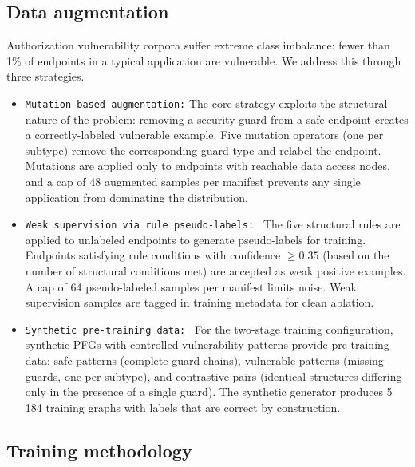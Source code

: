 \subsection{Data augmentation}
\label{sec:det-augmentation}

Authorization vulnerability corpora suffer extreme class imbalance: fewer
than 1\% of endpoints in a typical application are vulnerable. We address
this through three strategies.

\begin{itemize}


\item \texttt{Mutation-based augmentation:}
The core strategy exploits the structural nature of the problem: removing a
security guard from a safe endpoint creates a correctly-labeled vulnerable
example. Five mutation operators (one per subtype) remove the corresponding
guard type and relabel the endpoint. Mutations are applied only to endpoints
with reachable data access nodes, and a cap of 48 augmented samples per
manifest prevents any single application from dominating the distribution.

\item \texttt{Weak supervision via rule pseudo-labels: }
The five structural rules are applied to unlabeled endpoints to generate
pseudo-labels for training. Endpoints satisfying rule conditions with
confidence $\geq 0.35$ (based on the number of structural conditions met)
are accepted as weak positive examples. A cap of 64 pseudo-labeled samples
per manifest limits noise. Weak supervision samples are tagged in training
metadata for clean ablation.

\item \texttt{Synthetic pre-training data: }
For the two-stage training configuration, synthetic PFGs with controlled
vulnerability patterns provide pre-training data: safe patterns (complete
guard chains), vulnerable patterns (missing guards, one per subtype), and
contrastive pairs (identical structures differing only in the presence of a
single guard). The synthetic generator produces 5\,184 training graphs with
labels that are correct by construction.

     
\end{itemize}

\subsection{Training methodology}
\label{sec:det-training}


